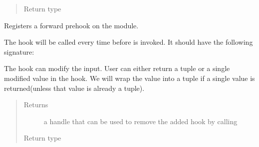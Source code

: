\documentclass[letterpaper,10pt,english]{sphinxmanual}
\begin{document}
\begin{fulllineitems}
\begin{fulllineitems}
\begin{quote}
\begin{description}
\item[{Return type}] \leavevmode
{}

\end{description}\end{quote}

\end{fulllineitems}


\begin{fulllineitems}
\label{\detokenize{api/dynamics:geology.metamodelling.dynamics.LatentSpaceDynamics.register_forward_pre_hook}}
Registers a forward pre\sphinxhyphen{}hook on the module.

The hook will be called every time before {\hyperref[\detokenize{api/dynamics:geology.metamodelling.dynamics.LatentSpaceDynamics.forward}]{}} is invoked.
It should have the following signature:

\begin{sphinxVerbatim}[commandchars=\\\{\}]
      
\end{sphinxVerbatim}

The hook can modify the input. User can either return a tuple or a
single modified value in the hook. We will wrap the value into a tuple
if a single value is returned(unless that value is already a tuple).
\begin{quote}\begin{description}
\item[{Returns}] \leavevmode
a handle that can be used to remove the added hook by calling

\item[{Return type}] \leavevmode
{}

\end{description}\end{quote}

\end{fulllineitems}


\end{fulllineitems}
\end{document}
